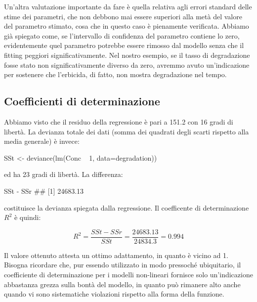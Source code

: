 \documentclass[a4paper,12pt,oneside]{book}
\newenvironment{Shaded}{}{}
\newcommand{\KeywordTok}[1]{#1}
\newcommand{\DataTypeTok}[1]{#1}
\newcommand{\DecValTok}[1]{#1}
\newcommand{\StringTok}[1]{#1}
\newcommand{\CommentTok}[1]{#1}
\newcommand{\OperatorTok}[1]{#1}
\newcommand{\NormalTok}[1]{#1}
\begin{document}
Un'altra valutazione importante da fare è quella relativa agli errori standard delle stime dei parametri, che non debbono mai essere superiori alla metà del valore del parametro stimato, cosa che in questo caso è pienamente verificata. Abbiamo già spiegato come, se l'intervallo di confidenza del parametro contiene lo zero, evidentemente quel parametro potrebbe essere rimosso dal modello senza che il fitting peggiori significativamente. Nel nostro esempio, se il tasso di degradazione fosse stato non significativamente diverso da zero, avremmo avuto un'indicazione per sostenere che l'erbicida, di fatto, non mostra degradazione nel tempo.

\hypertarget{coefficienti-di-determinazione}{%
\subsection{Coefficienti di determinazione}\label{coefficienti-di-determinazione}}

Abbiamo visto che il residuo della regressione è pari a 151.2 con 16 gradi di libertà. La devianza totale dei dati (somma dei quadrati degli scarti rispetto alla media generale) è invece:

\begin{Shaded}
\begin{Highlighting}[]
\NormalTok{SSt <-}\StringTok{ }\KeywordTok{deviance}\NormalTok{(}\KeywordTok{lm}\NormalTok{(Conc }\OperatorTok{~}\StringTok{ }\DecValTok{1}\NormalTok{, }\DataTypeTok{data=}\NormalTok{degradation))}
\end{Highlighting}
\end{Shaded}

ed ha 23 gradi di libertà. La differenza:

\begin{Shaded}
\begin{Highlighting}[]
\NormalTok{SSt }\OperatorTok{-}\StringTok{ }\NormalTok{SSr}
\CommentTok{## [1] 24683.13}
\end{Highlighting}
\end{Shaded}

costituisce la devianza spiegata dalla regressione. Il coefficente di determinazione \(R^2\) è quindi:

\[R^2 = \frac{SSt - SSr}{SSt} = \frac{24683.13}{24834.3} = 0.994\]

Il valore ottenuto attesta un ottimo adattamento, in quanto è vicino ad 1. Bisogna ricordare che, pur essendo utilizzato in modo pressoché ubiquitario, il coefficiente di determinazione per i modelli non-lineari fornisce solo un'indicazione abbastanza grezza sulla bontà del modello, in quanto può rimanere alto anche quando vi sono sistematiche violazioni rispetto alla forma della funzione.
\end{document}

